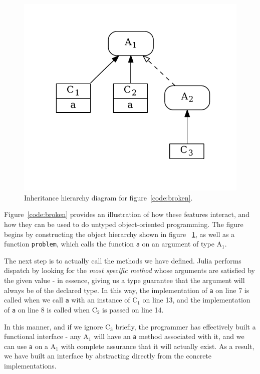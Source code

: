 \documentclass[preprint]{sigplanconf}
\newcommand{\xt}[1]{\texttt{#1}}
\newcommand{\cnum}[2]{$\text{#1}_#2$}
\begin{document}
\begin{figure}
\centering
\vspace{-1em}
\includegraphics[scale=.6]{example2.pdf}
\vspace{-2em}
\caption{Inheritance hierarchy diagram for figure~\ref{code:broken}.}
\label{fig:algo}
\vspace{-1.3em}
\end{figure}
Figure~\ref{code:broken} provides an illustration of how these features 
interact, and how they can be used to do untyped object-oriented programming.
The figure begins by constructing the object hierarchy shown in figure~
\ref{fig:algo}, as well as a function \xt{problem}, which calls the function 
\xt{a} on an argument of type $\text{A}_1$.

The next step is to actually call the methods we have defined. Julia performs
dispatch by looking for the \emph{most specific method} whose arguments are
satisfied by the given value - in essence, giving us a type guarantee that the
argument will always be of the declared type. In this way, the implementation 
of \xt{a} on line 7 is called when we call \xt{a} with an instance of $\text{C}_1$
on line 13, and the implementation of \xt{a} on line 8 is called when 
$\text{C}_2$ is passed on line 14.

In this manner, and if we ignore \cnum{C}{3} briefly, the programmer has 
effectively built a functional interface - any \cnum{A}{1} will have an \xt{a} 
method associated with it, and we can use \xt{a} on a \cnum{A}{1} with complete
assurance that it will actually exist. As a result, we have built an interface
by abstracting directly from the concrete implementations.
\end{document}
